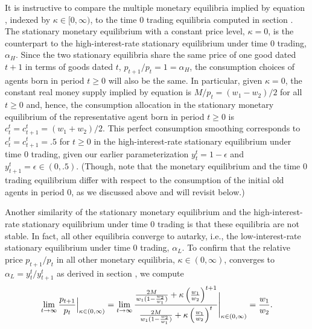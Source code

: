 It is instructive to compare the multiple monetary equilibria implied by 
equation , indexed by $\kappa \in [0,\infty)$, to the time 0 
trading equilibria computed in section . The 
stationary monetary equilibrium with a constant price level, $\kappa =0$, 
is the counterpart to the high-interest-rate stationary equilibrium under 
time 0 trading, $\alpha_H$. 
Since the two stationary equilibria share the same price of one good dated
$t+1$ in terms of goods dated $t$, $p_{t+1} / p_t = 1 = \alpha_H$, the 
consumption choices of agents born in period $t\geq 0$ will also be the same.
In particular, given $\kappa =0$, the constant real money supply implied by 
equation  is $M/p_t = (w_1-w_2)/2$ for all $t\geq 0$ and, hence, 
the consumption allocation in the stationary monetary equilibrium of the 
representative agent born in period $t\geq 0$ is
$c_t^t = c_{t+1}^t = (w_1 + w_2)/2$.
This perfect consumption smoothing corresponds to $c_t^t=c_{t+1}^t=.5$ for $t\geq 0$ 
in the high-interest-rate stationary equilibrium under time 0 trading, given
our earlier parameterization $y_t^t=1-\epsilon$ and $y_{t+1}^t=\epsilon\in (0, .5)$. 
(Though, note that the monetary equilibrium and the time $0$ trading equilibrium
differ with respect to the consumption of the initial old agents in period $0$, as 
we discussed above and will revisit below.)

Another similarity of the stationary monetary equilibrium and the 
high-interest-rate stationary equilibrium under time 0 trading is that these
equilibria are not stable. In fact, all other equilibria converge to autarky,
i.e., the low-interest-rate stationary equilibrium under time 0 trading, $\alpha_L$.  
To confirm that the relative price $p_{t+1} / p_t$ in all other monetary
equilibria, $\kappa\in(0,\infty)$, converges to 
$\alpha_L=y_t^t/y_{t+1}^t$ as derived in section , 
we compute
$$
\lim_{t\to\infty} {p_{t+1} \over p_t} \Big{\vert}_{\kappa\in(0,\infty)}
= \lim_{t\to\infty} { { {2 M \over w_1 (1 - {w_2 \over w_1})} + \kappa
  \left({w_1\over w_2}\right)^{t+1} } \over { {2 M \over w_1 (1 - {w_2 \over w_1})} + \kappa
  \left({w_1\over w_2}\right)^t } } \Bigg{\vert}_{\kappa\in(0,\infty)}
= {w_1\over w_2}.
$$




